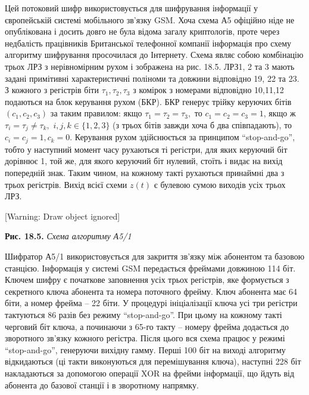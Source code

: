 \documentclass[a4paper]{article}
\newcounter{}
\begin{document}
Цей потоковий шифр використовується для шифрування інформації у європейській
системі мобільного зв’язку GSM.  Хоча схема А5 офіційно ніде не опублікована і
досить довго не була відома загалу криптологів, проте через недбалість
працівників Британської телефонної компанії інформація про схему алгоритму
шифрування просочилася до Інтернету. Схема являє собою комбінацію трьох ЛРЗ з
нерівномірним рухом і зображена на рис. 18.5. ЛРЗ1, 2 та 3 мають задані
примітивні характеристичні поліноми та довжини відповідно 19, 22 та 23. З
кожного з регістрів біти  ${\tau _{{1}},\tau _{{2}},\tau _{{3}}}$ з комірок з
номерами відповідно  10,11,12 подаються на блок керування рухом (БКР).  БКР 
генерує трійку керуючих бітів  ${(c_{{1}},c_{{2}},c_{{3}})}$ за таким правилом:
якщо  ${\tau _{{1}}=\tau _{{2}}=\tau _{{3}},}$ то 
${c_{{1}}=c_{{2}}=c_{{3}}=1}$, якщо ж  ${\tau _{{i}}=\tau _{{j}}\neq \tau
_{{k}},}$  ${i,j,k\in \{1,2,3\}}$ (з трьох бітів завжди хоча б два
співпадають), то  ${c_{{i}}=c_{{j}}=1,c_{{k}}=0\text{.}}$ Керування рухом
здійснюється за принципом “stop{}-and{}-go”, тобто у наступний момент часу
рухаються ті регістри, для яких керуючий біт дорівнює 1, той же, для якого
керуючий біт нулевий, стоїть і видає на вихід попередній знак. Таким чином, на
кожному такті рухаються принаймні два з трьох регістрів. Вихід всієї схеми 
${z(t)}$ є булевою сумою виходів  усіх трьох ЛРЗ.

[Warning: Draw object ignored]

{\centering
\textbf{Рис. 1}\textbf{8}\textbf{.5. }\textit{Схема алгоритму А5}\textit{/1}
\par}


\bigskip

Шифратор А5/1 використовується для закриття зв’язку між абонентом та базовою
станцією. Інформація у системі GSM передається фреймами довжиною 114 біт.
Ключем шифру є початкове заповнення усіх трьох регістрів, яке формується з
секретного ключа абонента та номера поточного фрейму. Ключ абонента має 64
біти, а номер фрейма – 22 біти. У процедурі ініціалізації ключа усі три
регістри тактуються 86 разів без режиму “stop{}-and{}-go”. При цьому на кожному
такті черговий біт ключа, а починаючи з 65-го такту – номеру фрейма додається
до зворотного зв’язку кожного регістра. Після цього вся схема працює у режимі
“stop{}-and{}-go”, генеруючи вихідну гамму. Перші 100 біт на виході алгоритму
відкидаються (ці такти виконуються для перемішування ключа), наступні 228 біт
накладаються за допомогою операції XOR на  фрейми інформації, що йдуть від
абонента до базової станції і в зворотному напрямку.
\end{document}
